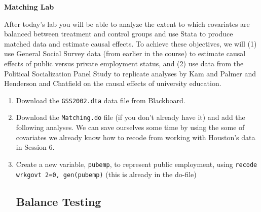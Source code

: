 \documentclass[a4paper,12pt]{article}
\begin{document}
\begin{center}
\textbf{Matching Lab}
\end{center}

After today's lab you will be able to analyze the extent to which covariates are balanced between treatment and control groups and use Stata to produce matched data and estimate causal effects. To achieve these objectives, we will (1) use General Social Survey data (from earlier in the course) to estimate causal effects of public versus private employment status, and (2) use data from the Political Socialization Panel Study to replicate analyses by Kam and Palmer and Henderson and Chatfield on the causal effects of university education.

\begin{enumerate}\itemsep0.5em

\subsection*{GSS Data}

\item Download the \texttt{GSS2002.dta} data file from Blackboard.
\item Download the \texttt{Matching.do} file (if you don't already have it) and add the following analyses. We can save ourselves some time by using the some of covariates we already know how to recode from working with Houston's data in Session 6.
\item Create a new variable, \texttt{pubemp}, to represent public employment, using \texttt{recode wrkgovt 2=0, gen(pubemp)} (this is already in the do-file)

\subsection*{Balance Testing}


\end{enumerate}
\end{document}
